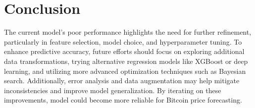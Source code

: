 \section{Conclusion}\label{sec:conclusion}

The current model’s poor performance highlights the need for further refinement, particularly in feature selection,
model choice, and hyperparameter tuning. To enhance predictive accuracy, future efforts should focus on exploring
additional data transformations, trying alternative regression models like XGBoost or deep learning, and utilizing
more advanced optimization techniques such as Bayesian search. Additionally, error analysis and data augmentation
may help mitigate inconsistencies and improve model generalization. By iterating on these improvements, model
could become more reliable for Bitcoin price forecasting.